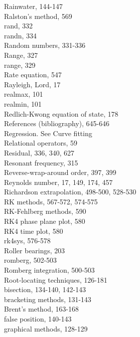 \documentclass[../main.tex]{subfiles}
\begin{document}
\begin{multicols}{3}
    Rainwater, 144-147\\
    Ralston's method, 569\\
    rand, 332\\
    randn, 334\\
    Random numbers, 331-336\\
    Range, 327\\
    range, 329\\
    Rate equation, 547\\
    Rayleigh, Lord, 17\\
    realmax, 101\\
    realmin, 101\\
    Redlich-Kwong equation of state, 178\\
    References (bibliography), 645-646\\
    Regression. See Curve fitting\\
    Relational operators, 59\\
    Residual, 336, 340, 627\\
    Resonant frequency, 315\\
    Reverse-wrap-around order, 397, 399\\
    Reynolds number, 17, 149, 174, 457\\
    Richardson extrapolation, 498-500, 528-530\\
    RK methods, 567-572, 574-575\\
    RK-Fehlberg methods, 590\\
    RK4 phase plane plot, 580\\
    RK4 time plot, 580\\
    rk4sys, 576-578\\
    Roller bearings, 203\\
    romberg, 502-503\\
    Romberg integration, 500-503\\
    Root-locating techniques, 126-181\\
    \hspace*{3mm}bisection, 134-140, 142-143\\
    \hspace*{3mm}bracketing methods, 131-143\\
    \hspace*{3mm}Brent's method, 163-168\\
    \hspace*{3mm}false position, 140-143\\
    \hspace*{3mm}graphical methods, 128-129\\

\end{multicols}
\end{document}
